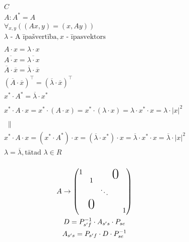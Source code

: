 \documentclass[12pt]{article}
\begin{document}
\begin{gather*}
	C \\
	A : A^{*} = A \\
	\forall_{x,y} ((Ax,y) = (x,Ay)) \\
	\lambda \text{ - A īpašvertība}, x \text{  -  īpasvektors} \\
	\\
	A \cdot x = \lambda \cdot x \\
	\overline{A \cdot x} = \overline{\lambda \cdot x} \\
	\overline{A} \cdot \overline{x}  = \overline{\lambda} \cdot \overline{x} \\
	(\overline{A} \cdot \overline{x})^{\intercal}  = (\overline{\lambda} \cdot \overline{x})^{\intercal} \\
	x^{*} \cdot A^{*} = \overline{\lambda} \cdot x^{*} \\ 
	\\
	x^* \cdot A \cdot x = x^* \cdot (A \cdot x) = x^* \cdot (\lambda \cdot x) = \lambda \cdot x^* \cdot x = \lambda \cdot |x|^2 \\
	\\ \; \; \| \\ %
	x^* \cdot A \cdot x = (x^* \cdot A^*) \cdot x = (\overline{\lambda} \cdot x^*) \cdot x = \overline\lambda \cdot x^* \cdot x = \overline\lambda \cdot |x|^2 \\
	\lambda = \overline\lambda, \text{tātad } \lambda \in R \\
\end{gather*}

\newcommand\x{\times}
\newcommand\bigzero{\makebox(0,0){\text{\huge0}}}
\newcommand*{\bord}{\multicolumn{1}{c|}{}}

\begin{gather}
	A \rightarrow  	
	\begin{pmatrix}
	1 & && \bigzero   \\ 
    	& 1 &  \\
	& &  \ddots  &\\ 
        & \bigzero  &  \\
    	& &  & &  1  \\ 	
    \end{pmatrix} \\
     D = P_{s'f}^{-1} \cdot A_{s's} \cdot P_{se} \\    
     A_{s's} = P_{s'f} \cdot D \cdot P_{se}^{-1}
\end{gather}

\pagebreak
\end{document}

